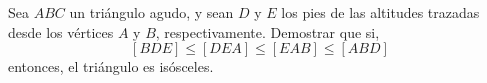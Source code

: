 Sea $ ABC$ un triángulo agudo, y sean $ D$ y $ E$ los pies de las altitudes trazadas desde los vértices $ A$ y $ B$, respectivamente. Demostrar que si,
\[ [BDE] \le [DEA] \le [EAB] \le [ABD] \]
entonces, el triángulo es isósceles.
